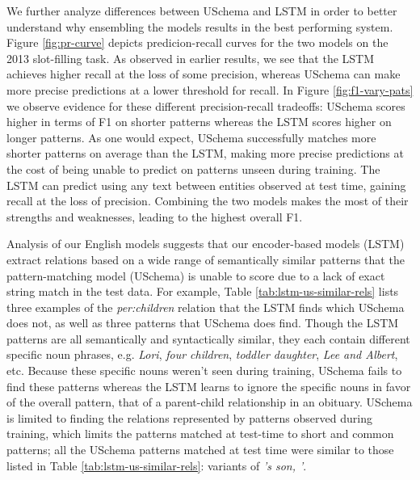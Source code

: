 We further analyze differences between USchema and LSTM in order to better understand why ensembling the models results in the best performing system. Figure \ref{fig:pr-curve} depicts predicion-recall curves for the two models on the 2013 slot-filling task. As observed in earlier results, we see that the LSTM achieves higher recall at the loss of some precision, whereas USchema can make more precise predictions at a lower threshold for recall. In Figure \ref{fig:f1-vary-pats} we observe evidence for these different precision-recall tradeoffs: USchema scores higher in terms of F1 on shorter patterns whereas the LSTM scores higher on longer patterns. As one would expect, USchema successfully matches more shorter patterns on average than the LSTM, making more precise predictions at the cost of being unable to predict on patterns unseen during training. The LSTM can predict using any text between entities observed at test time, gaining recall at the loss of precision. Combining the two models makes the most of their strengths and weaknesses, leading to the highest overall F1.


Analysis of our English models suggests that our encoder-based models (LSTM) extract relations based on a wide range of semantically similar patterns that the pattern-matching model (USchema) is unable to score due to a lack of exact string match in the test data. For example, Table \ref{tab:lstm-us-similar-rels} lists three examples of the \emph{per:children} relation that the LSTM finds which USchema does not, as well as three patterns that USchema does find. Though the LSTM patterns are all semantically and syntactically similar, they each contain different specific noun phrases, e.g. \emph{Lori}, \emph{four children}, \emph{toddler daughter}, \emph{Lee and Albert}, etc. Because these specific nouns weren't seen during training, USchema fails to find these patterns whereas the LSTM learns to ignore the specific nouns in favor of the overall pattern, that of a parent-child relationship in an obituary. USchema is limited to finding the relations represented by patterns observed during training, which limits the patterns matched at test-time to short and common patterns; all the USchema patterns matched at test time were similar to those listed in Table \ref{tab:lstm-us-similar-rels}: variants of \emph{'s son, '}.



